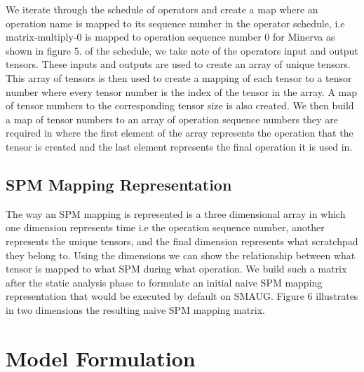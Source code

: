 

We iterate through the schedule of operators and create a map where an
operation name is mapped to its sequence number in the operator schedule, i.e
matrix-multiply-0 is mapped to operation sequence number 0 for Minerva as shown
in figure 5. %
of the schedule, we take note of the operators input and output tensors. These inputs
and outputs are used to create an array of unique tensors. This array of
tensors is then used to create a mapping of each tensor to a tensor number
where every tensor number is the index of the tensor in the array. A map of 
tensor numbers to the corresponding tensor size is also created. We then
build a map of tensor numbers to an array of operation sequence numbers they are
required in where the first element of the array represents the operation that
the tensor is created and the last element represents the final operation
it is used in.


\subsection{SPM Mapping Representation}

The way an SPM mapping is represented is a three dimensional array in which one
dimension represents time i.e the operation sequence number, another represents
the unique tensors, and the final dimension represents what scratchpad they
belong to. Using the dimensions we can show the relationship between what tensor
is mapped to what SPM during what operation. We build such a matrix after the
static analysis phase to formulate an initial naive SPM mapping representation
that would be executed by default on SMAUG. Figure 6 %
illustrates in two dimensions the resulting naive SPM mapping matrix.

\section{Model Formulation}

